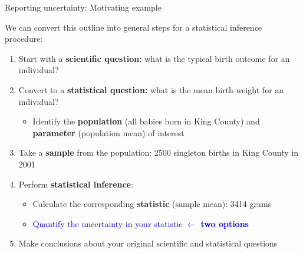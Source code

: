 \documentclass[10pt,t]{beamer}
\begin{document}
\begin{frame}{Reporting uncertainty: Motivating example}

\vspace{-3 mm}

We can convert this outline into general steps for a statistical inference procedure:

\vspace{0.3cm}

\begin{enumerate}
	\item Start with a \textbf{scientific question:} what is the typical birth outcome for an individual?
	\item Convert to a \textbf{statistical question:} what is the mean birth weight for an individual?
	\begin{itemize}
		\item Identify the \textbf{population} (all babies born in King County) and \textbf{parameter} (population mean) of interest
	\end{itemize}
	\item Take a \textbf{sample} from the population: 2500 singleton births in King County in 2001
	\item Perform \textbf{statistical inference}:
	\begin{itemize}
		\item Calculate the corresponding \textbf{statistic} (sample mean): 3414 grams
		\item \textcolor{blue}{Quantify the uncertainty in your statistic $\leftarrow$ \textbf{two options}}
	\end{itemize}
	\item Make conclusions about your original scientific and statistical questions
\end{enumerate}
\end{frame}
\end{document}
